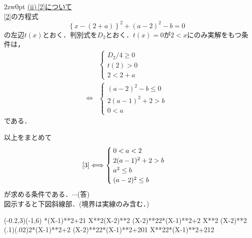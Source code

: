 \documentclass[a4j]{jarticle}
\begin{document}
\begin{multicols}{2}
\begin{indentation}{2zw}{0pt}
     \noindent\underline{(ii)\,\eqref{2}について}\\
     \eqref{2}の方程式
          \[\left\{x-(2+a)\right\}^2+(a-2)^2-b=0\]
     の左辺$t(x)$とおく．判別式を$D_2$とおく．$t(x)=0$が$2<x$にのみ実解をもつ条件は，
     \begin{align*}
               &\begin{cases}
               D_2/4\ge0 \\
               t(2)>0 \\
               2<2+a
               \end{cases}\\
          \Longleftrightarrow
               &\begin{cases}
               (a-2)^2-b\le0 \\
               2(a-1)^2+2>b \\
               0<a
               \end{cases}
          \end{align*}     
     である．\\     
     \end{indentation}
以上をまとめて
     \[\eqref{3}\Longleftrightarrow 
          \begin{cases}
          0<a<2\\
          2(a-1)^2+2>b \\
          a^2\le b \\
          (a-2)^2\le b
          \end{cases}
     \]
が求める条件である．$\cdots$(答)\\

図示すると下図斜線部．(境界は実線のみ含む．)\\

     \begin{zahyou}[ul=10mm](-0.2,3)(-1,6)
     \def\fx{X**2}
     \def\gx{(X-2)**2}
     \def\hx{2*(X-1)**2+2}
     \def\aval{1}
     \YTen\hx\aval\A
     \YKouten\fx\gx{}{}\xii\C
     \YKouten\gx\hx{}{}\xiii\D
     \YGurafu*\fx
     \YGurafu*\gx
     \YGurafu(.1)(.02)\hx{\xmin}{\xmax}
     \Put\A[syaei=xy,xlabel=1,ylabel=2]{}
     \Put\B[syaei=xy,xlabel=2,ylabel=4]{}
     \Put\C[syaei=xy,xlabel=1,ylabel=1]{}
     \YNurii*\gx\hx{0}{1}
     \YNurii*\fx\hx{1}{2}
     \siromaru{\E;\F}
     \end{zahyou}


\newpage
\end{multicols}
\end{document}
